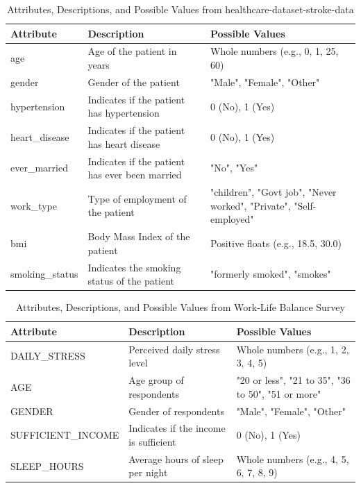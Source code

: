 \documentclass[runningheads]{llncs}
\begin{document}
\begin{enumerate}
\begin{table}  
\centering    
\caption{Attributes, Descriptions, and Possible Values from healthcare-dataset-stroke-data}\label{tab1} 

\begin{tabular}{|l|l|l|} 
\hline     

\textbf{Attribute} & \textbf{Description} & \textbf{Possible Values} \\        \hline        age & Age of the patient in years & Whole numbers (e.g., 0, 1, 25, 60) \\        \hline        gender & Gender of the patient & "Male", "Female", "Other" \\        \hline        hypertension & Indicates if the patient has hypertension & 0 (No), 1 (Yes) \\        \hline        heart\_disease & Indicates if the patient has heart disease & 0 (No), 1 (Yes) \\        \hline        ever\_married & Indicates if the patient has ever been married & "No", "Yes" \\        \hline        work\_type & Type of employment of the patient & "children", "Govt job", "Never worked", 
"Private", "Self-employed" \\        \hline        bmi & Body Mass Index of the patient & Positive floats (e.g., 18.5, 30.0) \\        \hline        smoking\_status & Indicates the smoking status of the patient & "formerly smoked", "smokes"\\        
\hline    
\end{tabular}    
\end{table}

\begin{table}[ht]
    \centering
    \caption{Attributes, Descriptions, and Possible Values from Work-Life Balance Survey}
    \begin{tabular}{|l|l|l|} %
        \hline
        \textbf{Attribute} & \textbf{Description} & \textbf{Possible Values} \\ \hline
        DAILY\_STRESS      & Perceived daily stress level & Whole numbers (e.g., 1, 2, 3, 4, 5) \\ \hline
        AGE                 & Age group of respondents & "20 or less", "21 to 35", "36 to 50", "51 or more" \\ \hline
        GENDER              & Gender of respondents & "Male", "Female", "Other" \\ \hline
        SUFFICIENT\_INCOME  & Indicates if the income is sufficient & 0 (No), 1 (Yes) \\ \hline
        SLEEP\_HOURS        & Average hours of sleep per night & Whole numbers (e.g., 4, 5, 6, 7, 8, 9) \\ \hline
    \end{tabular}
    \label{tab:work_life_balance_attributes}
\end{table}


\end{enumerate}
\end{document}
